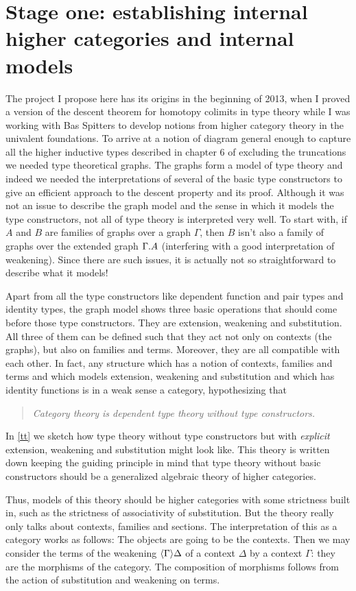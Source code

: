 \section{Stage one: establishing internal higher categories and internal models}
The project I propose here has its origins in the beginning of 2013, when I proved a version
of the descent theorem for homotopy colimits in type theory while I was working
with Bas Spitters to develop notions from higher category theory in the
univalent foundations. To arrive at a
notion of diagram general enough to capture all the higher inductive types described
in chapter 6 of \cite{TheBook} excluding the truncations we needed type
theoretical graphs. The graphs form a model of type theory and indeed we needed
the interpretations of several of the basic type constructors to give an efficient approach
to the descent property and its proof. Although it was not an issue to describe the graph model
and the sense in which it models the type constructors, 
not all of type theory is interpreted very well. To start with, if $A$ and $B$ 
are families of graphs over a graph $\Gamma$, then $B$ isn't also a family of 
graphs over the extended graph $\ctxext{\Gamma}{A}$ (interfering with a good 
interpretation of weakening). Since there are such issues, it is actually
not so straightforward to describe what it models!

Apart from all the type constructors like dependent function and pair types and
identity types, the graph model shows three basic operations that should come
before those type constructors. They are extension, weakening and substitution.
All three of them can be defined such that they act not only on contexts (the graphs), 
but also on families and terms. Moreover, they are all compatible with each 
other. In fact, any structure which has a notion of contexts, families and terms
and which models extension, weakening and substitution and which has identity
functions is in a weak sense a category, hypothesizing that
\begin{quote}
\emph{Category theory is dependent type theory without type constructors.}
\end{quote}
In \autoref{tt} we sketch how type theory without type constructors but with
\emph{explicit} extension, weakening and substitution might look like. This
theory is written down keeping the guiding principle in mind that type theory
without basic constructors should be a generalized algebraic theory of higher
categories.

Thus, models of this theory should be higher categories with some strictness
built in, such as the strictness of associativity of substitution. But the
theory really only talks about contexts, families and sections. The interpretation
of this as a category works as follows: The objects are going to be the contexts.
Then we may consider the terms of the weakening $\ctxwk{\Gamma}{\Delta}$ of a
context $\Delta$ by a context $\Gamma$: they are the morphisms of the category.
The composition of morphisms follows from the action of substitution and
weakening on terms. 

